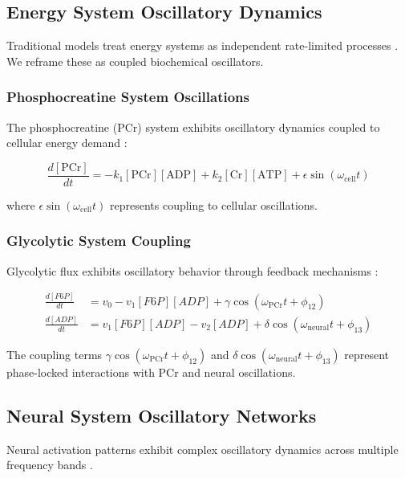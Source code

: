 \documentclass[twocolumn]{article}
\begin{document}
\subsection{Energy System Oscillatory Dynamics}

Traditional models treat energy systems as independent rate-limited processes \citep{brooks2005exercise}. We reframe these as coupled biochemical oscillators.

\subsubsection{Phosphocreatine System Oscillations}

The phosphocreatine (PCr) system exhibits oscillatory dynamics coupled to cellular energy demand \citep{sahlin2011creatine}:

\begin{equation}
\frac{d[\text{PCr}]}{dt} = -k_1[\text{PCr}][\text{ADP}] + k_2[\text{Cr}][\text{ATP}] + \epsilon \sin(\omega_{\text{cell}}t)
\label{eq:pcr_oscillations}
\end{equation}

where $\epsilon \sin(\omega_{\text{cell}}t)$ represents coupling to cellular oscillations.

\subsubsection{Glycolytic System Coupling}

Glycolytic flux exhibits oscillatory behavior through feedback mechanisms \citep{selkov1968self}:

\begin{align}
\frac{d[F6P]}{dt} &= v_0 - v_1[F6P][ADP] + \gamma \cos(\omega_{\text{PCr}}t + \phi_{12}) \label{eq:f6p_coupled} \\
\frac{d[ADP]}{dt} &= v_1[F6P][ADP] - v_2[ADP] + \delta \cos(\omega_{\text{neural}}t + \phi_{13}) \label{eq:adp_coupled}
\end{align}

The coupling terms $\gamma \cos(\omega_{\text{PCr}}t + \phi_{12})$ and $\delta \cos(\omega_{\text{neural}}t + \phi_{13})$ represent phase-locked interactions with PCr and neural oscillations.

\subsection{Neural System Oscillatory Networks}

Neural activation patterns exhibit complex oscillatory dynamics across multiple frequency bands \citep{wilson1972excitatory,dayan2001theoretical}.
\end{document}
